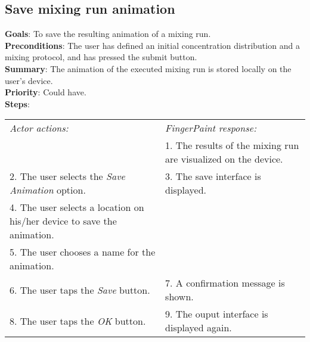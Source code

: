 \begin{appendices}
  \section{Save mixing run animation}
  \textbf{Goals}: To save the resulting animation of a mixing run.\\
  \textbf{Preconditions}: The user has defined an initial concentration distribution and a mixing protocol, and has pressed the submit button.\\
  \textbf{Summary}: The animation of the executed mixing run is stored locally on the user's device.\\
  \textbf{Priority}: Could have.\\
  \textbf{Steps}: \\
  \begin{tabular}{ p{} p{} }
  	\emph{Actor actions:} & \emph{FingerPaint response:} \\
	   & 1. The results of the mixing run are visualized on the device. \\
	 2. The user selects the \emph{Save Animation} option. & 3. The save interface is displayed.\\
	 4. The user selects a location on his/her device to save the animation. & \\
	 5. The user chooses a name for the animation. & \\
	 6. The user taps the \emph{Save} button. & 7. A confirmation message is shown. \\
	 8. The user taps the \emph{OK} button. & 9. The ouput interface is displayed again. \\
  \end{tabular}
  

\end{appendices}
